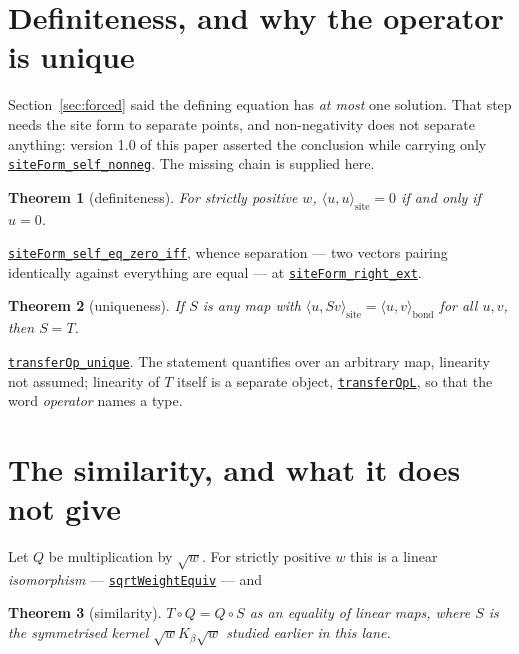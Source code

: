 \documentclass[11pt]{article}
\newtheorem{theorem}{Theorem}[section]
\theoremstyle{definition}
\newcommand{\anchor}{c90dc745ab8cd1ba7ddc02aa16fed3de339bf958}
\newcommand{\osline}[3]{%
  \href{https://github.com/lluiseriksson/THE-ERIKSSON-PROGRAMME/blob/\anchor/YangMills/OS/#1.lean\#L#2}{\nolinkurl{#3}}}
\begin{document}
\section{Definiteness, and why the operator is unique}\label{sec:unique}

Section~\ref{sec:forced} said the defining equation has \emph{at most} one
solution.  That step needs the site form to separate points, and
non-negativity does not separate anything: version 1.0 of this paper asserted
the conclusion while carrying only
\osline{SpatialReconstruction}{SITENNVEC}{siteForm\_self\_nonneg}.  The
missing chain is supplied here.

\begin{theorem}[definiteness]\label{thm:def}
For strictly positive $w$, $\langle u,u\rangle_{\mathrm{site}}=0$ if and only if
$u=0$.
\end{theorem}

\osline{SpatialReconstruction}{DEFLINE}{siteForm\_self\_eq\_zero\_iff}, whence
separation --- two vectors pairing identically against everything are equal ---
at \osline{SpatialReconstruction}{SEPLINE}{siteForm\_right\_ext}.

\begin{theorem}[uniqueness]\label{thm:uniq}
If $S$ is any map with $\langle u,Sv\rangle_{\mathrm{site}}
=\langle u,v\rangle_{\mathrm{bond}}$ for all $u,v$, then $S=T$.
\end{theorem}

\osline{SpatialReconstruction}{UNIQLINE}{transferOp\_unique}.  The statement
quantifies over an arbitrary map, linearity not assumed; linearity of $T$
itself is a separate object,
\osline{SpatialReconstruction}{OPLLINE}{transferOpL}, so that the word
\emph{operator} names a type.

\section{The similarity, and what it does not give}\label{sec:spec}

Let $Q$ be multiplication by $\sqrt{w}$.  For strictly positive $w$ this is a
linear \emph{isomorphism} --- \osline{SpatialReconstruction}{QEQUIVLINE}{sqrtWeightEquiv}
--- and

\begin{theorem}[similarity]\label{thm:sim}
$T\circ Q=Q\circ S$ as an equality of linear maps, where $S$ is the symmetrised
kernel $\sqrt{w}K_\beta\sqrt{w}$ studied earlier in this lane.
\end{theorem}
\end{document}
